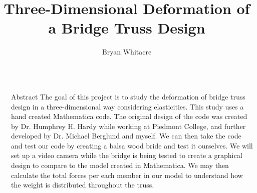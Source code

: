 \documentclass[final]{beamer}
\title{ Three-Dimensional Deformation of a Bridge Truss Design} %
\author{Bryan Whitacre} %
\institute{\small $^{1}$Department of Mathematics and Physics, Piedmont College, Demorest, GA
           }%
\newlength{\sepwid}
\newlength{\onecolwid}
\begin{document}

\setlength{\belowcaptionskip}{2ex} %
\setlength\belowdisplayshortskip{2ex} %

\begin{frame}[t] %

\begin{columns}[t] %

\begin{column}{\sepwid}\end{column} %

\begin{column}{\onecolwid} %



\begin{alertblock}{Abstract}
\vspace{0.3in}
The goal of this project is to study the deformation of bridge truss design in a three-dimensional way considering elasticities. This study uses a hand created Mathematica code. The original design of the code was created by Dr. Humphrey H. Hardy while working at Piedmont College, and further developed by Dr. Michael Berglund and myself. We can then take the code and test our code by creating a balsa wood bride and test it ourselves. We will set up a video camera while the bridge is being tested to create a graphical design to compare to the model created in Mathematica. We may then calculate the total forces per each member in our model to understand how the weight is distributed throughout the truss. 

\end{alertblock}


\end{column}
\end{columns}
\end{frame}
\end{document}

